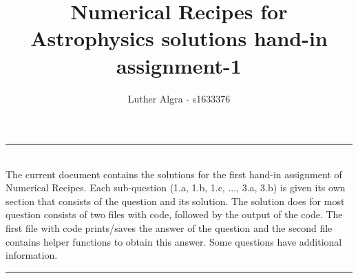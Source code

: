 \documentclass[a4paper,10pt]{article}
\title{\textbf{Numerical Recipes for Astrophysics solutions hand-in assignment-1}}
\author{Luther Algra - s1633376}
\renewenvironment{abstract}
 { \vspace*{0.3cm} \textbf{\abstractname} \vspace{0.1cm} \\ \ignorespaces}
 {\par\medskip \vspace{0.1cm}}
\begin{document}
\maketitle

\hrule
\begin{abstract}
The current document contains the solutions for the first hand-in assignment of Numerical Recipes. Each sub-question (1.a, 1.b, 1.c, ..., 3.a, 3.b) is given its own section that consists of the question and its solution. The solution does for most question consists of two files with code, followed by the output of the code. The first file with code prints/saves the answer of the question and the second file contains helper functions to obtain this answer. Some questions have additional information.

\end{abstract}
\hrule
\vspace{0.5cm}















  
\end{document}
